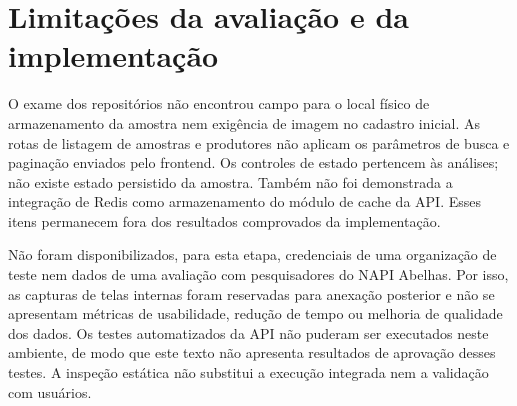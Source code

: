 \section{Limitações da avaliação e da implementação}
\label{sec:limitacoes}

O exame dos repositórios não encontrou campo para o local físico de armazenamento da amostra nem exigência de imagem no cadastro inicial. As rotas de listagem de amostras e produtores não aplicam os parâmetros de busca e paginação enviados pelo frontend. Os controles de estado pertencem às análises; não existe estado persistido da amostra. Também não foi demonstrada a integração de Redis como armazenamento do módulo de cache da API. Esses itens permanecem fora dos resultados comprovados da implementação.

Não foram disponibilizados, para esta etapa, credenciais de uma organização de teste nem dados de uma avaliação com pesquisadores do NAPI Abelhas. Por isso, as capturas de telas internas foram reservadas para anexação posterior e não se apresentam métricas de usabilidade, redução de tempo ou melhoria de qualidade dos dados. Os testes automatizados da API não puderam ser executados neste ambiente, de modo que este texto não apresenta resultados de aprovação desses testes. A inspeção estática não substitui a execução integrada nem a validação com usuários.
